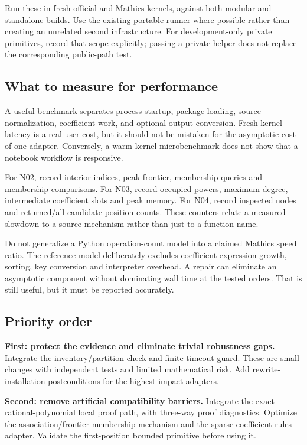 \documentclass[11pt,letterpaper]{article}
\begin{document}
Run these in fresh official and Mathics kernels, against both modular and
standalone builds. Use the existing portable runner where possible rather
than creating an unrelated second infrastructure. For development-only
private primitives, record that scope explicitly; passing a private helper
does not replace the corresponding public-path test.
\cite{repo-workflow,repo-runner}

\subsection{What to measure for performance}
A useful benchmark separates process startup, package loading, source
normalization, coefficient work, and optional output conversion. Fresh-kernel
latency is a real user cost, but it should not be mistaken for the asymptotic
cost of one adapter. Conversely, a warm-kernel microbenchmark does not show
that a notebook workflow is responsive.

For N02, record interior indices, peak frontier, membership queries and
membership comparisons. For N03, record occupied powers, maximum degree,
intermediate coefficient slots and peak memory. For N04, record inspected
nodes and returned/all candidate position counts. These counters relate a
measured slowdown to a source mechanism rather than just to a function name.

Do not generalize a Python operation-count model into a claimed Mathics
speed ratio. The reference model deliberately excludes coefficient
expression growth, sorting, key conversion and interpreter overhead.
A repair can eliminate an asymptotic component without dominating wall time
at the tested orders. That is still useful, but it must be reported accurately.

\subsection{Priority order}
\textbf{First: protect the evidence and eliminate trivial robustness gaps.}
Integrate the inventory/partition check and finite-timeout guard. These are
small changes with independent tests and limited mathematical risk. Add
rewrite-installation postconditions for the highest-impact adapters.

\textbf{Second: remove artificial compatibility barriers.}
Integrate the exact rational-polynomial local proof path, with three-way
proof diagnostics. Optimize the association/frontier membership mechanism
and the sparse coefficient-rules adapter. Validate the first-position
bounded primitive before using it.
\end{document}
